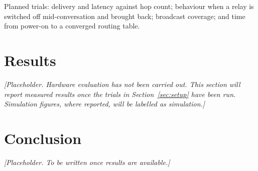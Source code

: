 \documentclass[conference]{IEEEtran}
\begin{document}
Planned trials: delivery and latency against hop count; behaviour when a relay is
switched off mid-conversation and brought back; broadcast coverage; and time from
power-on to a converged routing table.

\section{Results}\label{sec:results}

%
%

\textit{[Placeholder. Hardware evaluation has not been carried out. This section
will report measured results once the trials in Section~\ref{sec:setup} have been
run. Simulation figures, where reported, will be labelled as simulation.]}

\section{Conclusion}


\textit{[Placeholder. To be written once results are available.]}



\end{document}
